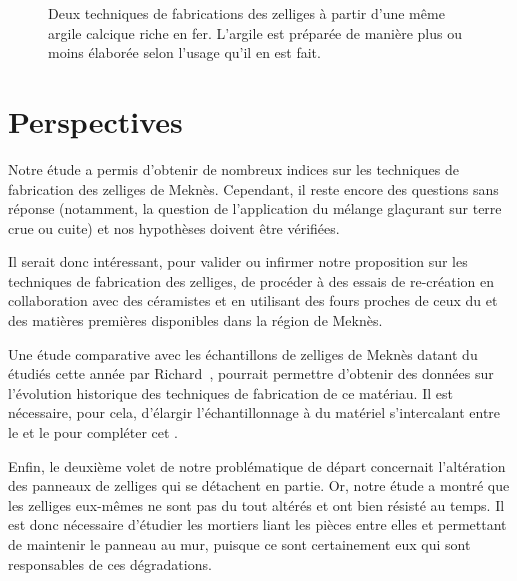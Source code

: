 \begin{figure}[p]
  \caption{Deux techniques de fabrications des zelliges à partir d'une 
           même argile calcique riche en fer. L'argile est préparée de 
           manière plus ou moins élaborée selon l'usage qu'il en est 
           fait.}
  \label{fig:protocole}
\end{figure}


\chapter{Perspectives}

Notre étude a permis d'obtenir de nombreux indices sur les techniques 
de fabrication des zelliges de Meknès. Cependant, il reste encore des 
questions sans réponse (notamment, la question de l'application du 
mélange glaçurant sur terre crue ou cuite) et nos hypothèses doivent 
être vérifiées.

Il serait donc intéressant, pour valider ou infirmer notre proposition 
sur les techniques de fabrication des zelliges, de procéder à des 
essais de re-création en collaboration avec des céramistes et en 
utilisant des fours proches de ceux du  et des matières 
premières disponibles dans la région de Meknès.

Une étude comparative avec les échantillons de zelliges de Meknès 
datant du  étudiés cette année par Richard~, 
pourrait permettre d'obtenir des données sur l'évolution historique 
des techniques de fabrication de ce matériau. Il est nécessaire, pour 
cela, d'élargir l'échantillonnage à du matériel s'intercalant entre 
le  et le  pour compléter cet 
.

Enfin, le deuxième volet de notre problématique de départ concernait 
l'altération des panneaux de zelliges qui se détachent en partie. Or, 
notre étude a montré que les zelliges eux-mêmes ne sont pas du tout 
altérés et ont bien résisté au temps. Il est donc nécessaire d'étudier 
les mortiers liant les pièces entre elles et permettant de maintenir 
le panneau au mur, puisque ce sont certainement eux qui sont 
responsables de ces dégradations.
